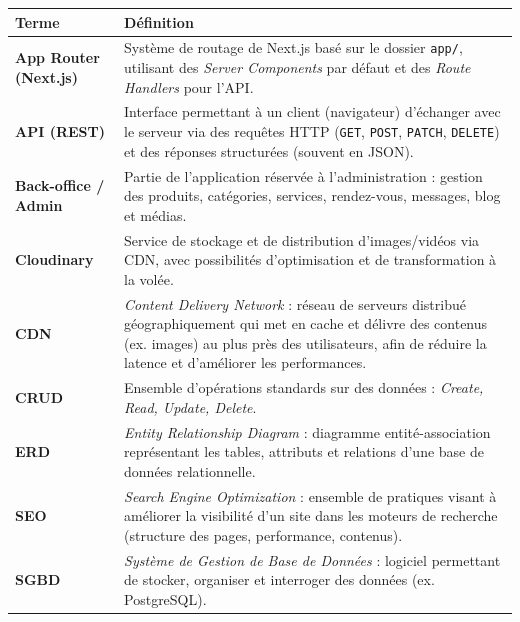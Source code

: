 \renewcommand{\arraystretch}{1.15}
\begin{longtable}{@{}p{}p{}@{}}
\toprule
\textbf{Terme} & \textbf{Définition} \\
\midrule
\endhead

\textbf{App Router (Next.js)} & Système de routage de Next.js basé sur le dossier \texttt{app/}, utilisant des \textit{Server Components} par défaut et des \textit{Route Handlers} pour l’API. \\

\textbf{API (REST)} & Interface permettant à un client (navigateur) d’échanger avec le serveur via des requêtes HTTP (\texttt{GET}, \texttt{POST}, \texttt{PATCH}, \texttt{DELETE}) et des réponses structurées (souvent en JSON). \\

\textbf{Back-office / Admin} & Partie de l’application réservée à l’administration : gestion des produits, catégories, services, rendez-vous, messages, blog et médias. \\

\textbf{Cloudinary} & Service de stockage et de distribution d’images/vidéos via CDN, avec possibilités d’optimisation et de transformation à la volée. \\

\textbf{CDN} & \textit{Content Delivery Network} : réseau de serveurs distribué géographiquement qui met en cache et délivre des contenus (ex. images) au plus près des utilisateurs, afin de réduire la latence et d’améliorer les performances. \\

\textbf{CRUD} & Ensemble d’opérations standards sur des données : \textit{Create, Read, Update, Delete}. \\

\textbf{ERD} & \textit{Entity Relationship Diagram} : diagramme entité-association représentant les tables, attributs et relations d’une base de données relationnelle. \\

\textbf{SEO} & \textit{Search Engine Optimization} : ensemble de pratiques visant à améliorer la visibilité d’un site dans les moteurs de recherche (structure des pages, performance, contenus). \\

\textbf{SGBD} & \textit{Système de Gestion de Base de Données} : logiciel permettant de stocker, organiser et interroger des données (ex. PostgreSQL). \\


\end{longtable}
